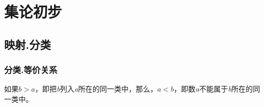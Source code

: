 \chapter{集论初步}
\section{映射.分类}
\label{subsecmapclass}

\subsection{分类.等价关系}
如果$b>a$，即把\emph{b}列入\emph{a}所在的同一类中，那么，$a<b$，即数\emph{a}不能属于\emph{b}所在的同一类中。